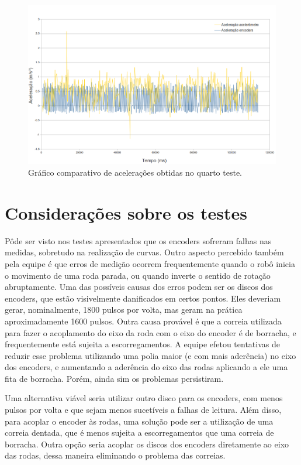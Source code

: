 \begin{figure}[H]
	\centering
	\includegraphics[width=1\textwidth]{./figuras/testes/teste4/grafico_acel.png}
	\caption{Gráfico comparativo de acelerações obtidas no quarto teste.}
	\label{fig:teste4_acel_grafico}
\end{figure}

\section{Considerações sobre os testes}

Pôde ser visto nos testes apresentados que os encoders sofreram falhas nas medidas, sobretudo na realização de curvas. Outro aspecto percebido também pela equipe é que erros de medição ocorrem frequentemente quando o robô inicia o movimento de uma roda parada, ou quando inverte o sentido de rotação abruptamente. Uma das possíveis causas dos erros podem ser os discos dos encoders, que estão visivelmente danificados em certos pontos. Eles deveriam gerar, nominalmente, 1800 pulsos por volta, mas geram na prática aproximadamente 1600 pulsos.
Outra causa provável é que a correia utilizada para fazer o acoplamento do eixo da roda com o eixo do encoder é de borracha, e frequentemente está sujeita a escorregamentos. A equipe efetou tentativas de reduzir esse problema utilizando uma polia maior (e com mais aderência) no eixo dos encoders, e aumentando a aderência do eixo das rodas aplicando a ele uma fita de borracha. Porém, ainda sim os problemas persistiram. 

Uma alternativa viável seria utilizar outro disco para os encoders, com menos pulsos por volta e que sejam menos sucetíveis a falhas de leitura. Além disso, para acoplar o encoder às rodas, uma solução pode ser a utilização de uma correia dentada, que é menos sujeita a escorregamentos que uma correia de borracha. Outra opção seria acoplar os discos dos encoders diretamente ao eixo das rodas, dessa maneira eliminando o problema das correias.

